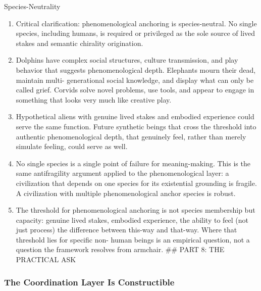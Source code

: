 \documentclass[
]{article}
\begin{document}
Species-Neutrality

\begin{enumerate}
\def\labelenumi{\arabic{enumi}.}
\setcounter{enumi}{235}
\item
  Critical clarification: phenomenological anchoring is species-neutral.
  No single species, including humans, is required or privileged as the
  sole source of lived stakes and semantic chirality origination.
\item
  Dolphins have complex social structures, culture transmission, and
  play behavior that suggests phenomenological depth. Elephants mourn
  their dead, maintain multi- generational social knowledge, and display
  what can only be called grief. Corvids solve novel problems, use
  tools, and appear to engage in something that looks very much like
  creative play.
\item
  Hypothetical aliens with genuine lived stakes and embodied experience
  could serve the same function. Future synthetic beings that cross the
  threshold into authentic phenomenological depth, that genuinely feel,
  rather than merely simulate feeling, could serve as well.
\item
  No single species is a single point of failure for meaning-making.
  This is the same antifragility argument applied to the
  phenomenological layer: a civilization that depends on one species for
  its existential grounding is fragile. A civilization with multiple
  phenomenological anchor species is robust.
\item
  The threshold for phenomenological anchoring is not species membership
  but capacity: genuine lived stakes, embodied experience, the ability
  to feel (not just process) the difference between this-way and
  that-way. Where that threshold lies for specific non- human beings is
  an empirical question, not a question the framework resolves from
  armchair. \#\# PART 8: THE PRACTICAL ASK
\end{enumerate}

\subsubsection{The Coordination Layer Is
Constructible}\label{the-coordination-layer-is-constructible}
\end{document}
